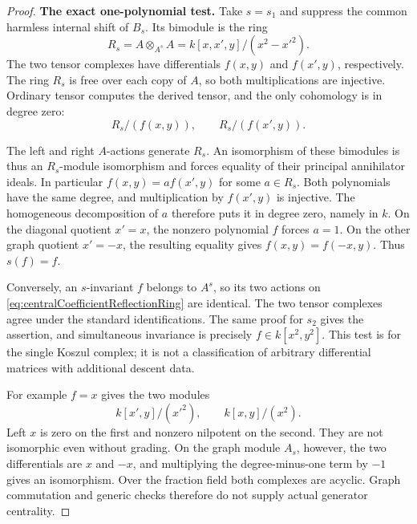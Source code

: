 \documentclass[11pt,a4paper]{article}
\theoremstyle{named}\newtheorem{finding}{Finding}[section]
\theoremstyle{definition}\newtheorem{definition}[finding]{Definition}
\theoremstyle{remark}\newtheorem{remark}[finding]{Remark}
\begin{document}
\begin{proof}
\par\smallskip\noindent\textbf{The exact one-polynomial test.}\quad
Take \(s=s_1\) and suppress the common harmless
internal shift of \(B_s\). Its bimodule is the ring
\begin{equation}\label{eq:centralCoefficientReflectionRing}
 R_s=A\otimes_{A^s}A
     =k[x,x',y]/(x^2-x'^2).
\end{equation}
The two tensor complexes have differentials
\(f(x,y)\) and \(f(x',y)\), respectively.
The ring \(R_s\) is free over each copy of \(A\),
so both multiplications are injective. Ordinary
tensor computes the derived tensor, and the only
cohomology is in degree zero:
\begin{equation}\label{eq:centralCoefficientAnnihilators}
 R_s/(f(x,y)),\qquad R_s/(f(x',y)).
\end{equation}

The left and right \(A\)-actions generate \(R_s\).
An isomorphism of these bimodules is thus an
\(R_s\)-module isomorphism and forces equality
of their principal annihilator ideals.
In particular \(f(x,y)=a f(x',y)\) for some
\(a\in R_s\). Both polynomials have the same
degree, and multiplication by \(f(x',y)\) is
injective. The homogeneous decomposition of \(a\)
therefore puts it in degree zero, namely in \(k\).
On the diagonal quotient \(x'=x\), the nonzero
polynomial \(f\) forces \(a=1\).
On the other graph quotient \(x'=-x\), the
resulting equality gives \(f(x,y)=f(-x,y)\).
Thus \(s(f)=f\).

Conversely, an \(s\)-invariant \(f\) belongs
to \(A^s\), so its two actions on
\eqref{eq:centralCoefficientReflectionRing} are
identical. The two tensor complexes agree under
the standard identifications. The same proof for
\(s_2\) gives the assertion, and simultaneous
invariance is precisely \(f\in k[x^2,y^2]\).
This test is for the single Koszul complex; it is
not a classification of arbitrary differential
matrices with additional descent data.

For example \(f=x\) gives the two modules
\[
 k[x',y]/(x'^2),\qquad k[x,y]/(x^2).
\]
Left \(x\) is zero on the first and nonzero
nilpotent on the second. They are not isomorphic
even without grading.
On the graph module \(A_s\), however, the two
differentials are \(x\) and \(-x\), and multiplying
the degree-minus-one term by \(-1\) gives an
isomorphism. Over the fraction field both complexes
are acyclic. Graph commutation and generic checks
therefore do not supply actual generator centrality.


\end{proof}
\end{document}
